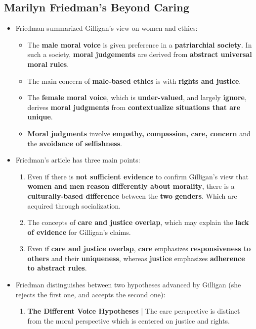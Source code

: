 \documentclass[16pt]{article}
\begin{document}
    \subsection*{Marilyn Friedman's Beyond Caring}
    \begin{itemize}
        \item Friedman summarized Gilligan's view on women and ethics: 
        \begin{itemize}
            \item The \textbf{male moral voice} is given preference in a \textbf{patriarchial society}. In such a society, \textbf{moral judgements} are derived from \textbf{abstract universal moral rules}.
            \item The main concern of \textbf{male-based ethics} is with \textbf{rights and justice}.
            \item The \textbf{female moral voice}, which is \textbf{under-valued}, and largely \textbf{ignore}, derives \textbf{moral judgments} from \textbf{contextualize situations that are unique}.
            \item \textbf{Moral judgments} involve \textbf{empathy, compassion, care, concern} and the \textbf{avoidance of selfishness}.
        \end{itemize}
        \item Friedman's article has three main points:
        \begin{enumerate}
            \item Even if there is \textbf{not sufficient evidence }to confirm Gilligan's view that \textbf{women and men reason differently about morality}, there is a \textbf{culturally-based difference} between the \textbf{two genders}. Which are acquired through socialization.
            \item The concepts of \textbf{care and justice overlap}, which may explain the \textbf{lack of evidence} for Gilligan's claims.
            \item Even if \textbf{care and justice overlap}, \textbf{care} emphasizes \textbf{responsiveness to others} and their \textbf{uniqueness}, whereas \textbf{justice} emphasizes \textbf{adherence to abstract rules}.
        \end{enumerate}        
        \item Friedman distinguishes between two hypotheses advanced by Gilligan (she rejects the first one, and accepts the second one):
        \begin{enumerate}
            \item \textbf{The Different Voice Hypotheses} | The care perspective is distinct from the moral perspective which is centered on justice and rights.

\end{enumerate}
\end{itemize}
\end{document}
